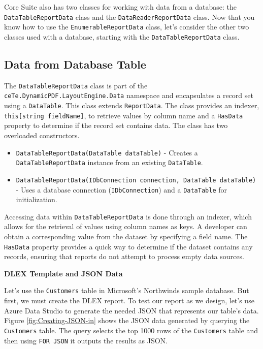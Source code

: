 \documentclass[american]{tufte-book}
\numberwithin{equation}{section}
\numberwithin{figure}{section}
\begin{document}
{{Core Suite also has two classes for working with data from a database:
the \texttt{DataTableReportData} class and the \texttt{DataReaderReportData}
class. Now that you know how to use the \texttt{EnumerableReportData}
class, let's consider the other two classes used with a database,
starting with the \texttt{DataTableReportData} class.

\subsection{Data from Database Table}

The \texttt{DataTableReportData} class is part of the \texttt{ceTe.DynamicPDF\allowbreak.LayoutEngine.Data}
namespace and encapsulates a record set using a \texttt{DataTable}.
This class extends \texttt{ReportData}. The class provides an indexer,
\texttt{this[string fieldName]}, to retrieve values by column
name and a \texttt{HasData} property to determine if the record set
contains data. The class has two overloaded constructors.
\begin{itemize}
\item \texttt{DataTableReportData(DataTable dataTable)} - Creates a \texttt{DataTableReportData}
instance from an existing \texttt{DataTable}.
\item \texttt{DataTableReportData(IDbConnection connection, DataTable dataTable)}
- Uses a database connection (\texttt{IDbConnection}) and a \texttt{DataTable}
for initialization.
\end{itemize}
Accessing data within \texttt{DataTableReportData} is done through
an indexer, which allows for the retrieval of values using column
names as keys. A developer can obtain a corresponding value from the
dataset by specifying a field name. The \texttt{HasData} property
provides a quick way to determine if the dataset contains any records,
ensuring that reports do not attempt to process empty data sources.
\noindent\begin{flushleft}
\textbf{DLEX Template and JSON Data}
\par\end{flushleft}

Let's use the \texttt{Customers} table in Microsoft's Northwinds sample
database.\cite{microsoft123} But first, we must create the DLEX report.
To test our report as we design, let's use Azure Data Studio to generate
the needed JSON that represents our table's data. Figure \ref{fig:Creating-JSON-in} shows the
JSON data generated by querying the \texttt{Customers} table. The
query selects the top 1000 rows of the \texttt{Customers} table and
then using \texttt{FOR JSON} it outputs the results as JSON.

}}
\end{document}
